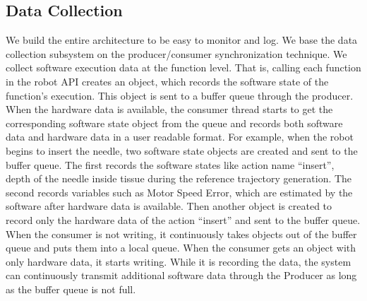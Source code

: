 \subsection{Data Collection}\label{subsec:datacollection}
We build the entire architecture to be easy to monitor and log. We base the data collection subsystem on the producer/consumer synchronization technique. We collect software execution data at the function level. That is, calling each function in the robot API
creates an object, which records the software state of the function’s execution. This object is sent to a buffer queue through the producer. When the hardware data is available, the consumer thread starts to get the corresponding software state object from the queue and records both software data and hardware data in a user readable format. For example, when the robot begins to insert the needle, two software state objects are created and sent to the buffer queue. The first records the software states like action name ``insert'', depth of the needle inside tissue during the reference trajectory generation. The second records variables such as Motor Speed Error, which are estimated by the software after hardware data is available. Then another object is created to record only the hardware data of the action ``insert'' and sent to the buffer queue. When the consumer is not writing, it continuously takes objects out of the buffer queue and puts them into a local queue. When the consumer gets an object with only hardware data, it starts writing. While it is recording the data, the system can continuously transmit additional software data through the Producer as long as the buffer queue is not full.

